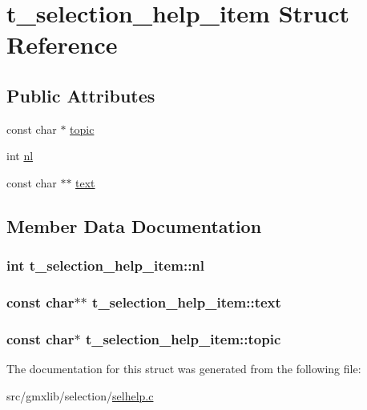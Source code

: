 \hypertarget{structt__selection__help__item}{\section{t\-\_\-selection\-\_\-help\-\_\-item \-Struct \-Reference}
\label{structt__selection__help__item}
}
\subsection*{\-Public \-Attributes}
\begin{DoxyCompactItemize}
\item 
const char $\ast$ \hyperlink{structt__selection__help__item_a26b5e496b3f4b54982d8ef36e2ffa8f2}{topic}
\item 
int \hyperlink{structt__selection__help__item_a7ff534ea01b212f7d565f62fd11565e4}{nl}
\item 
const char $\ast$$\ast$ \hyperlink{structt__selection__help__item_a739c9472c231280510fd26e22c32edda}{text}
\end{DoxyCompactItemize}


\subsection{\-Member \-Data \-Documentation}
\hypertarget{structt__selection__help__item_a7ff534ea01b212f7d565f62fd11565e4}{
\subsubsection[{nl}]{\setlength{\rightskip}{0pt plus 5cm}int {\bf t\-\_\-selection\-\_\-help\-\_\-item\-::nl}}}\label{structt__selection__help__item_a7ff534ea01b212f7d565f62fd11565e4}
\hypertarget{structt__selection__help__item_a739c9472c231280510fd26e22c32edda}{
\subsubsection[{text}]{\setlength{\rightskip}{0pt plus 5cm}const char$\ast$$\ast$ {\bf t\-\_\-selection\-\_\-help\-\_\-item\-::text}}}\label{structt__selection__help__item_a739c9472c231280510fd26e22c32edda}
\hypertarget{structt__selection__help__item_a26b5e496b3f4b54982d8ef36e2ffa8f2}{
\subsubsection[{topic}]{\setlength{\rightskip}{0pt plus 5cm}const char$\ast$ {\bf t\-\_\-selection\-\_\-help\-\_\-item\-::topic}}}\label{structt__selection__help__item_a26b5e496b3f4b54982d8ef36e2ffa8f2}


\-The documentation for this struct was generated from the following file\-:\begin{DoxyCompactItemize}
\item 
src/gmxlib/selection/\hyperlink{selhelp_8c}{selhelp.\-c}\end{DoxyCompactItemize}
